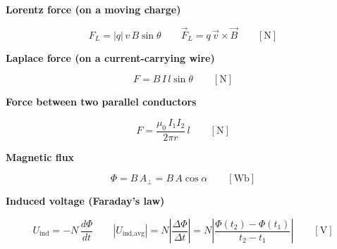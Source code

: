 \documentclass[11pt]{article}
\newcommand{\sub}[1]{\par\medskip\textbf{#1}\par}
\begin{document}
\sub{Lorentz force (on a moving charge)}
\[ F_L = |q|\,v\,B\sin\theta \qquad \vec F_L = q\,\vec v\times\vec B \qquad [\mathrm{N}] \]

\sub{Laplace force (on a current-carrying wire)}
\[ F = B\,I\,l\sin\theta \qquad [\mathrm{N}] \]

\sub{Force between two parallel conductors}
\[ F = \frac{\mu_0\,I_1 I_2}{2\pi r}\,l \qquad [\mathrm{N}] \]

\sub{Magnetic flux}
\[ \Phi = B\,A_\perp = B\,A\cos\alpha \qquad [\mathrm{Wb}] \]

\sub{Induced voltage (Faraday's law)}
\[ U_{\text{ind}} = -N\,\frac{d\Phi}{dt} \qquad |U_{\text{ind,avg}}| = N\left|\frac{\Delta\Phi}{\Delta t}\right| = N\left|\frac{\Phi(t_2) - \Phi(t_1)}{t_2 - t_1}\right| \qquad [\mathrm{V}] \]
\end{document}
